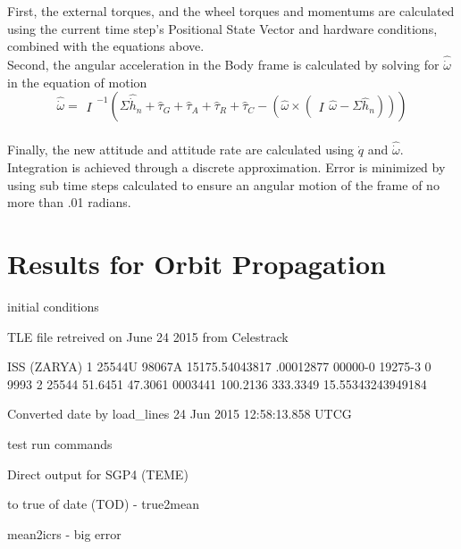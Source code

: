 \documentclass[12pt,letterpaper]{report}
\begin{document}
First, the external torques, and the wheel torques and momentums are calculated using the current time step's Positional State Vector and hardware conditions, combined with the equations above.
\\

Second, the angular acceleration in the Body frame is calculated by solving for $\hat{\dot{\omega}}$ in the equation of motion
\[\hat{\dot{\omega}} = \begin{matrix}I\end{matrix}^{-1}\left(\Sigma\hat{\dot{h}}_{n} + \hat{\tau}_{G} + \hat{\tau}_{A} + \hat{\tau}_{R} + \hat{\tau}_{C} - (\hat{\omega} \times ( \begin{matrix}I\end{matrix} \hat{\omega} - \Sigma\hat{h}_{n}))\right)\]
\\

Finally, the new attitude and attitude rate are calculated using $\dot{q}$ and $\hat{\dot{\omega}}$. Integration is achieved through a discrete approximation. Error is minimized by using sub time steps calculated to ensure an angular motion of the frame of no more than .01 radians.


\section{Results for Orbit Propagation}

initial conditions

TLE file retreived on June 24 2015 from Celestrack

ISS (ZARYA)             
1 25544U 98067A   15175.54043817  .00012877  00000-0  19275-3 0  9993
2 25544  51.6451  47.3061 0003441 100.2136 333.3349 15.55343243949184

Converted date by load_lines
24 Jun 2015 12:58:13.858 UTCG


test run commands

Direct output for SGP4 (TEME)

to true of date (TOD) - true2mean

mean2icrs - big error
\end{document}
